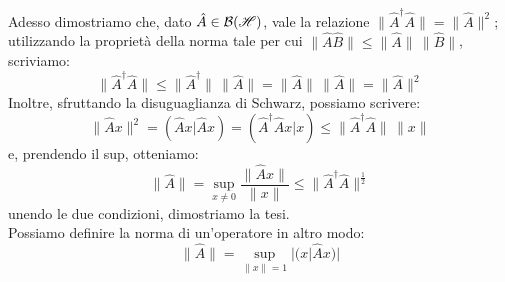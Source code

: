 Adesso dimostriamo che, dato $\hat{A} \in \mathcal{B}(\mathscr{H})$,  vale la relazione $\| \hat{A}^{\dagger} \hat{A} \|= \| \hat{A} \|^2$; utilizzando la proprietà della norma tale per cui $\| \hat{A} \hat{B} \| \leq \| \hat{A} \| \, \| \hat{B} \|$, scriviamo:
$$\| \hat{A}^{\dagger} \hat{A} \| \leq \|\hat{A}^{\dagger}\| \, \|\hat{A}\|= \|\hat{A}\| \, \|\hat{A}\| = \|\hat{A}\|^2$$
Inoltre, sfruttando la disuguaglianza di Schwarz, possiamo scrivere:
$$\| \hat{A}x\|^2=(\hat{A}x|\hat{A}x)=(\hat{A}^{\dagger} \hat{A}x|x) \leq \| \hat{A}^{\dagger} \hat{A}\| \, \|x\|$$
e, prendendo il sup, otteniamo:
$$\|\hat{A}\| = \sup_{x \neq 0} \frac{\|\hat{A}x\|}{\|x\|} \leq \|\hat{A}^{\dagger} \hat{A}\|^{\frac{1}{2}}$$
unendo le due condizioni, dimostriamo la tesi.\\
Possiamo definire la norma di un'operatore in altro modo:
$$\|\hat{A}\|=\sup_{\|x\|=1} |(x|\hat{A}x)|$$
\clearpage

